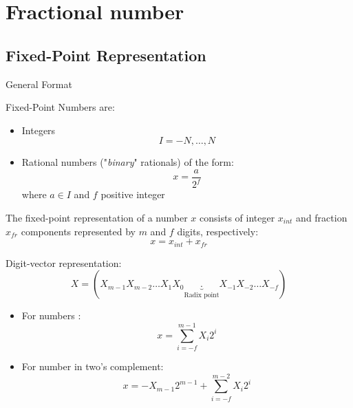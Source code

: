 
\section{Fractional number}
\subsection{Fixed-Point Representation}
\begin{parag}{General Format}
    \begin{definition}
        Fixed-Point Numbers are:
        \begin{itemize}
            \item Integers
            \[I = -N, \dots, N\]
            \item Rational numbers ("\textit{binary}" rationals) of the form:
            \[x = \frac{a}{2^f}\]
            where $a \in I$ and $f$ positive integer
        \end{itemize}
    \end{definition}
    The fixed-point representation of a number $x$ consists of integer $x_{int}$ and fraction $x_{fr}$ components represented by $m$ and $f$ digits, respectively:
    \[x = x_{int} + x_{fr}\]
    \begin{definition}
        Digit-vector representation: 
        \[X = (X_{m-1}X_{m-2}\dots X_1X_0\underbrace{.}_{\text{Radix point}}X_{-1}X_{-2}\dots X_{-f})\]
        \begin{itemize}
            \item For  numbers : 
            \[x = \sum_{i  = -f}^{m-1}X_i2^i\]
            \item For  number in two's complement: 
            \[x = -X_{m-1}2^{m-1} + \sum_{i = -f}^{m-2}X_i2^i\]
        \end{itemize}
    \end{definition}
\end{parag}
